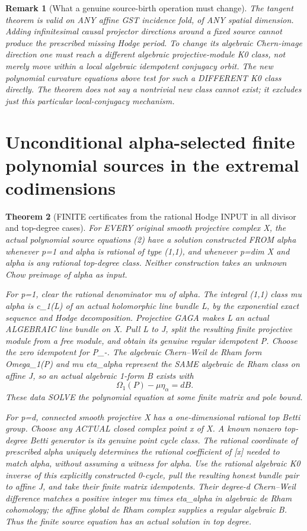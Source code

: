 \documentclass[11pt]{article}
\newtheorem{theorem}{Theorem}[section]
\newtheorem{remark}[theorem]{Remark}
\begin{document}
\begin{remark}[What a genuine source-birth operation must change]
The tangent theorem is valid on ANY affine GST
incidence fold, of ANY spatial dimension.
Adding infinitesimal causal projector directions
around a fixed source cannot produce the prescribed
missing Hodge period. To change its algebraic
Chern-image direction one must reach a different
algebraic projective-module K0 class, not merely
move within a local algebraic idempotent conjugacy
orbit. The new polynomial curvature equations
above test for such a DIFFERENT K0 class directly.
The theorem does not say a nontrivial new class
cannot exist; it excludes just this particular
local-conjugacy mechanism.
\end{remark}

\section{Unconditional alpha-selected finite polynomial sources in the extremal codimensions}
\begin{theorem}[FINITE certificates from the rational Hodge INPUT in all divisor and top-degree cases]
For EVERY original smooth projective complex X,
the actual polynomial source equations (2)
have a solution constructed FROM alpha
whenever p=1 and alpha is rational of type (1,1),
and whenever p=dim X and alpha is any rational
top-degree class. Neither construction
takes an unknown Chow preimage of alpha as input.

For p=1, clear the rational denominator mu of alpha.
The integral (1,1) class mu alpha is c_1(L)
of an actual holomorphic line bundle L,
by the exponential exact sequence and
Hodge decomposition. Projective GAGA makes
L an actual ALGEBRAIC line bundle on X.
Pull L to J, split the resulting finite
projective module from a free module,
and obtain its genuine regular idempotent P.
Choose the zero idempotent for P_-.
The algebraic Chern--Weil de Rham form
Omega_1(P) and mu eta_alpha represent
the SAME algebraic de Rham class on affine J,
so an actual algebraic 1-form B exists with
\[
 \boxed{\Omega_1(P)-\mu\eta_\alpha=dB.}          \tag{10}
\]
These data SOLVE the polynomial equation
at some finite matrix and pole bound.

For p=d, connected smooth projective X
has a one-dimensional rational top Betti
group. Choose any ACTUAL closed complex
point x of X. A known nonzero top-degree
Betti generator is its genuine point
cycle class. The rational coordinate
of prescribed alpha uniquely determines
the rational coefficient of [x] needed
to match alpha, without assuming a
witness for alpha. Use the rational
algebraic K0 inverse of this explicitly
constructed 0-cycle, pull the resulting
honest bundle pair to affine J, and
take their finite matrix idempotents.
Their degree-d Chern--Weil difference
matches a positive integer mu times
eta_alpha in algebraic de Rham cohomology;
the affine global de Rham complex
supplies a regular algebraic B.
Thus the finite source equation
has an actual solution in top degree.
\end{theorem}
\end{document}
